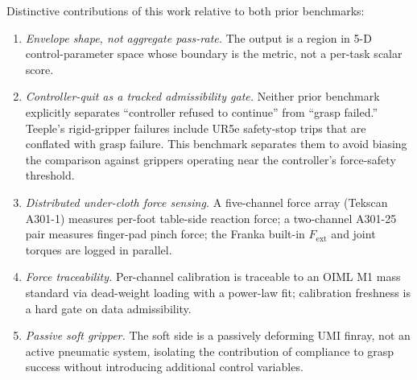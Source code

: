 \documentclass[10pt,letterpaper]{article}
\begin{document}
Distinctive contributions of this work relative to both prior benchmarks:

\begin{enumerate}[leftmargin=*,nosep]
    \item \emph{Envelope shape, not aggregate pass-rate.} The output is
          a region in 5-D control-parameter space whose boundary is the
          metric, not a per-task scalar score.
    \item \emph{Controller-quit as a tracked admissibility gate.}
          Neither prior benchmark explicitly separates ``controller
          refused to continue'' from ``grasp failed.'' Teeple's
          rigid-gripper failures include UR5e safety-stop trips that
          are conflated with grasp failure. This benchmark separates
          them to avoid biasing the comparison against grippers
          operating near the controller's force-safety threshold.
    \item \emph{Distributed under-cloth force sensing.} A five-channel
          force array (Tekscan A301-1) measures per-foot table-side
          reaction force; a two-channel A301-25 pair measures
          finger-pad pinch force; the Franka built-in $F_{\text{ext}}$
          and joint torques are logged in parallel.
    \item \emph{Force traceability.} Per-channel calibration is
          traceable to an OIML M1 mass standard via dead-weight loading
          with a power-law fit; calibration freshness is a hard gate
          on data admissibility.
    \item \emph{Passive soft gripper.} The soft side is a passively
          deforming UMI finray, not an active pneumatic system,
          isolating the contribution of compliance to grasp success
          without introducing additional control variables.
\end{enumerate}
\end{document}
